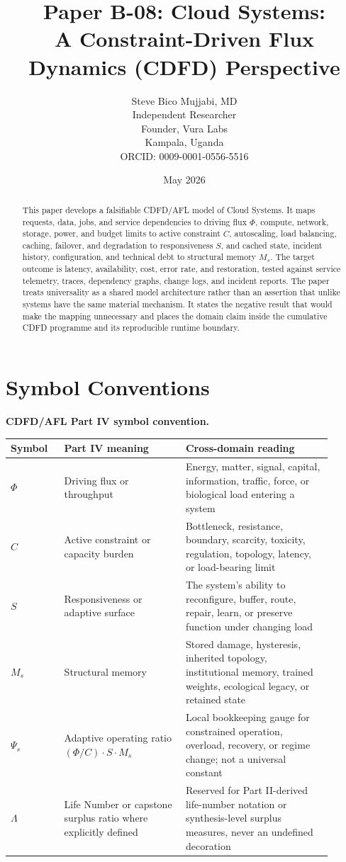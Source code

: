 \documentclass[11pt,a4paper]{article}
\title{\textbf{Paper B-08: Cloud Systems:\\ A Constraint-Driven Flux Dynamics (CDFD) Perspective}}
\author{Steve Bico Mujjabi, MD\\
\small Independent Researcher\\
\small Founder, Vura Labs\\
\small Kampala, Uganda\\
\small ORCID: 0009-0001-0556-5516}
\date{May 2026}
\begin{document}
\maketitle


\begin{abstract}
This paper develops a falsifiable CDFD/AFL model of Cloud Systems. It maps requests, data, jobs, and service dependencies to driving flux $\Phi$, compute, network, storage, power, and budget limits to active constraint $C$, autoscaling, load balancing, caching, failover, and degradation to responsiveness $S$, and cached state, incident history, configuration, and technical debt to structural memory $M_s$. The target outcome is latency, availability, cost, error rate, and restoration, tested against service telemetry, traces, dependency graphs, change logs, and incident reports. The paper treats universality as a shared model architecture rather than an assertion that unlike systems have the same material mechanism. It states the negative result that would make the mapping unnecessary and places the domain claim inside the cumulative CDFD programme and its reproducible runtime boundary.
\end{abstract}

\section*{Symbol Conventions}

\noindent\textbf{CDFD/AFL Part IV symbol convention.}
\begin{center}
{\small
\begin{tabular}{p{0.15\linewidth}p{0.34\linewidth}p{0.41\linewidth}}
\hline
Symbol & Part IV meaning & Cross-domain reading \\
\hline
$\Phi$ & Driving flux or throughput & Energy, matter, signal, capital, information, traffic, force, or biological load entering a system \\
$C$ & Active constraint or capacity burden & Bottleneck, resistance, boundary, scarcity, toxicity, regulation, topology, latency, or load-bearing limit \\
$S$ & Responsiveness or adaptive surface & The system's ability to reconfigure, buffer, route, repair, learn, or preserve function under changing load \\
$M_s$ & Structural memory & Stored damage, hysteresis, inherited topology, institutional memory, trained weights, ecological legacy, or retained state \\
$\Psi_s$ & Adaptive operating ratio $(\Phi/C)\cdot S\cdot M_s$ & Local bookkeeping gauge for constrained operation, overload, recovery, or regime change; not a universal constant \\
$\Lambda$ & Life Number or capstone surplus ratio where explicitly defined & Reserved for Part II-derived life-number notation or synthesis-level surplus measures, never an undefined decoration \\
\hline
\end{tabular}
}
\end{center}
\end{document}
